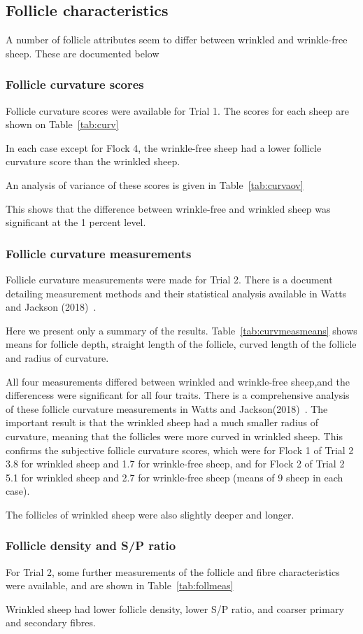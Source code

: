 \documentclass[titlepage]{article}  %
\begin{document}
\subsection{Follicle characteristics}
A number of follicle attributes seem to differ between wrinkled and wrinkle-free sheep. These are documented below

\subsubsection{Follicle curvature scores}
Follicle curvature scores were available for Trial 1. The scores for each sheep are shown on Table~\ref{tab:curv}

In each case except for Flock 4, the wrinkle-free sheep had a lower follicle curvature score than the wrinkled sheep.

An analysis of variance of these scores is given in Table~\ref{tab:curvaov}

This shows that the difference between wrinkle-free and wrinkled sheep was significant at the 1 percent level.

\subsubsection{Follicle curvature measurements}
Follicle curvature measurements were made for Trial 2. There is a document detailing measurement methods and their statistical analysis available in Watts and Jackson (2018)~\cite{watt:18}. 

Here we present only a summary of the results. Table~\ref{tab:curvmeasmeans} shows means for follicle depth, straight length of the follicle, curved length of the follicle and radius of curvature. 

All four measurements differed between wrinkled and wrinkle-free sheep,and the differencess were significant for all four traits.
There is a comprehensive analysis of these follicle curvature measurements in Watts and Jackson(2018)~\cite{watt:18}. 
The important result is that the wrinkled sheep had a much smaller radius of curvature, meaning that the follicles were more curved in wrinkled sheep. This confirms the subjective follicle curvature scores, which were for Flock 1 of Trial 2 3.8 for wrinkled sheep and 1.7 for wrinkle-free sheep, and for Flock 2 of Trial 2 5.1 for wrinkled sheep and 2.7 for wrinkle-free sheep (means of 9 sheep in each case).

 The follicles of wrinkled sheep were also slightly deeper and longer. 

\subsubsection{Follicle density and S/P ratio}
For Trial 2, some further measurements of the follicle and fibre characteristics were available, and are shown in Table~\ref{tab:follmeas}

Wrinkled sheep had lower follicle density, lower S/P ratio, and coarser primary and secondary fibres.
\end{document}
